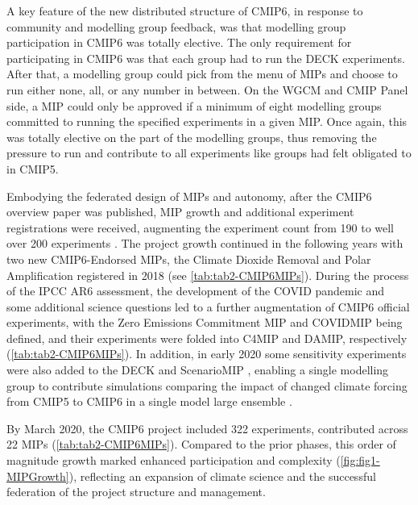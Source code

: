 \documentclass[manuscript]{copernicus}
\newcommand{\mycomment}[1]{}
\begin{document}
A key feature of the new distributed structure of CMIP6, in response to community and modelling group feedback, was that modelling group participation in CMIP6 was totally elective. The only requirement for participating in CMIP6 was that each group had to run the DECK experiments. After that, a modelling group could pick from the menu of MIPs and choose to run either none, all, or any number in between. On the WGCM and CMIP Panel side, a MIP could only be approved if a minimum of eight modelling groups committed to running the specified experiments in a given MIP. Once again, this was totally elective on the part of the modelling groups, thus removing the pressure to run and contribute to all experiments like groups had felt obligated to in CMIP5.

Embodying the federated design of MIPs and autonomy, after the \citet{eyring_overview_2016} CMIP6 overview paper was published, MIP growth and additional experiment registrations were received, augmenting the experiment count from 190 to well over 200 experiments \citep{balaji_requirements_2018}. The project growth continued in the following years with two new CMIP6-Endorsed MIPs, the Climate Dioxide Removal \citep[CDRMIP;][]{keller_carbon_2018} and Polar Amplification \citep[PAMIP;][]{smith_polar_2019} registered in 2018 (see \autoref{tab:tab2-CMIP6MIPs}). During the process of the IPCC AR6 assessment, the development of the COVID pandemic and some additional science questions led to a further augmentation of CMIP6 official experiments, with the Zero Emissions Commitment MIP \citep[ZECMIP;][]{jones_zero_2019} and COVIDMIP \citep{lamboll_modifying_2021} being defined, and their experiments were folded into C4MIP and DAMIP, respectively (\autoref{tab:tab2-CMIP6MIPs}). In addition, in early 2020 some sensitivity experiments were also added to the DECK and ScenarioMIP \citep{durack_cmip6_2024}, enabling a single modelling group to contribute simulations comparing the impact of changed climate forcing from CMIP5 to CMIP6 in a single model large ensemble \citep[e.g.,][]{fyfe_significant_2021,holland_new_2024}.

\mycomment{
https://github.com/WCRP-CMIP/CMIP6_CVs/issues/805 Proposed CMIP5-era experiment_ids for CMIP and ScenarioMIP
}

By March 2020, the CMIP6 project included 322 experiments, contributed across 22 MIPs (\autoref{tab:tab2-CMIP6MIPs}). Compared to the prior phases, this order of magnitude growth marked enhanced participation and complexity (\autoref{fig:fig1-MIPGrowth}), reflecting an expansion of climate science and the successful federation of the project structure and management.
\end{document}

